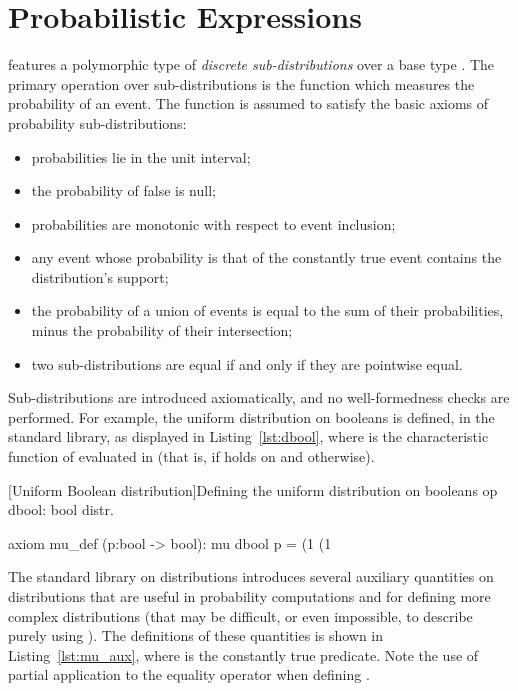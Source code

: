 \section{Probabilistic Expressions\label{sec:distributions}}

\EasyCrypt features a polymorphic type  of \emph{discrete
sub-distributions} over a base type . The primary operation over
sub-distributions is the function  which measures the probability of an event. The function is assumed to
satisfy the basic axioms of probability sub-distributions:
\begin{itemize}\itemsep-.5em
\item probabilities lie in the unit interval;
\item the probability of false is null;
\item probabilities are monotonic with respect to event inclusion;
\item any event whose probability is that of the constantly true event
  contains the distribution's support;
\item the probability of a union of events is equal to the sum of
  their probabilities, minus the probability of their intersection;
\item two sub-distributions are equal if and only if they are pointwise equal.
\end{itemize}

Sub-distributions are introduced axiomatically, and no well-formedness checks
are performed. For example, the uniform distribution on booleans is defined, in
the standard library, as displayed in Listing~\ref{lst:dbool}, where
 is the characteristic function of  evaluated in
 (that is,  if  holds on  and
 otherwise).

\begin{easycrypt}[label={lst:dbool}]{[Uniform Boolean distribution]Defining the uniform distribution on booleans}
op dbool: bool distr.

axiom mu_def (p:bool -> bool):
  mu dbool p =
    (1%
    (1%
\end{easycrypt}

The standard library on distributions
introduces several auxiliary quantities on distributions that are useful in
probability computations and for defining more complex distributions (that may
be difficult, or even impossible, to describe purely using ). The
definitions of these quantities is shown in Listing~\ref{lst:mu_aux}, where
 is the constantly true predicate. Note the use of partial
application to the equality operator when defining .


